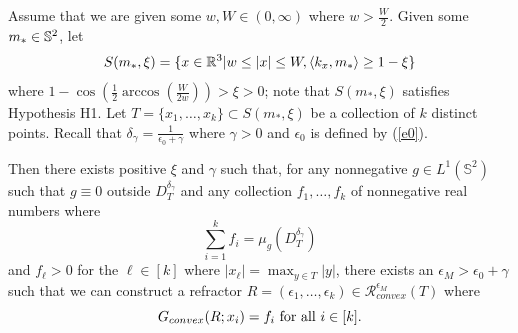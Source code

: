 \documentclass[review]{elsarticle}
\begin{document}
\begin{theorem}\label{convRefr}
Assume that we are given some $w,W\in(0,\infty)$ where $w>\frac{W}2$. Given some $m_*\in \mathbb{S}^2$, let 
\begin{equation}
    S(m_*,\xi)=\{x\in\mathbb{R}^3|w\le|x|\le W, \langle k_x,m_*\rangle\ge1-\xi \}
\end{equation}
where $1-\cos\left(\frac12\arccos\left(\frac{W}{2w}\right)\right)>\xi>0$; note that $S(m_*,\xi)$ satisfies Hypothesis H1. Let $T = \{x_1,\dots, x_k\}\subset S(m_*,\xi)$ be a collection of $k$ distinct points. Recall that $\delta_\gamma=\frac1{\epsilon_0+\gamma}$ where $\gamma>0$ and $\epsilon_0$ is defined by (\ref{e0}).  


Then there exists positive $\xi$ and $\gamma$ such that, for any nonnegative $g\in L^1(\mathbb{S}^2)$ such that $g\equiv 0$ outside $D_T^{\delta_\gamma}$ and any collection $f_1,\dots,f_k$ of nonnegative real numbers where
\begin{equation}
    \sum_{i=1}^k f_i = \mu_{g}(D_T^{\delta_\gamma})
\end{equation}
and $f_\ell>0$ for the $\ell\in[k]$ where $|x_\ell|=\max_{y\in T}|y|$, there exists an $\epsilon_M>\epsilon_0+\gamma$ such that we can construct a refractor $R = (\epsilon_1,\dots,\epsilon_k) \in \mathcal{R}_{convex}^{\epsilon_M} (T)$ where
\begin{equation}
G_{convex}(R; x_i) = f_i \textnormal{ for all } i \in[k].
\end{equation}
\end{theorem}
\end{document}
